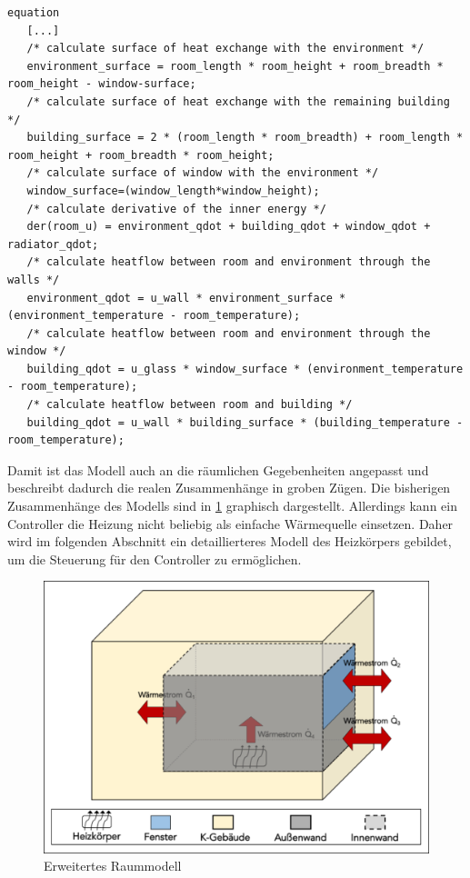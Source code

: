 \begin{lstlisting}[language=Modelica, caption={Erweitertes Gleichungssystem des Raumes unter Berücksichtigung der räumlichen Gegebenheiten in Modelica},label=lst:raumzwei]
equation
   [...]
   /* calculate surface of heat exchange with the environment */
   environment_surface = room_length * room_height + room_breadth * room_height - window-surface;
   /* calculate surface of heat exchange with the remaining building */
   building_surface = 2 * (room_length * room_breadth) + room_length * room_height + room_breadth * room_height;
   /* calculate surface of window with the environment */
   window_surface=(window_length*window_height);
   /* calculate derivative of the inner energy */
   der(room_u) = environment_qdot + building_qdot + window_qdot + radiator_qdot;
   /* calculate heatflow between room and environment through the walls */
   environment_qdot = u_wall * environment_surface * (environment_temperature - room_temperature);
   /* calculate heatflow between room and environment through the window */
   building_qdot = u_glass * window_surface * (environment_temperature - room_temperature);
   /* calculate heatflow between room and building */
   building_qdot = u_wall * building_surface * (building_temperature - room_temperature);
\end{lstlisting}

Damit ist das Modell auch an die räumlichen Gegebenheiten angepasst und beschreibt dadurch die realen Zusammenhänge in groben Zügen. Die bisherigen Zusammenhänge des Modells sind in \ref{fig:raumeins} graphisch dargestellt. Allerdings kann ein Controller die Heizung nicht beliebig als einfache Wärmequelle einsetzen. Daher wird im folgenden Abschnitt ein detaillierteres Modell des Heizkörpers gebildet, um die Steuerung für den Controller zu ermöglichen. 

\begin{figure}
\centering
\includegraphics[width=\textwidth]{abbildungen/20160316_raumeins}
\caption{Erweitertes Raummodell}
\label{fig:raumeins}
\end{figure}



